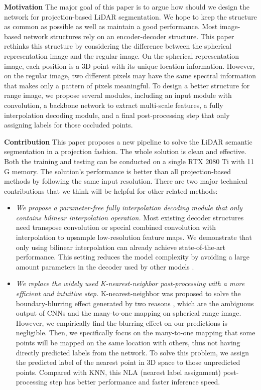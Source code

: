 \documentclass[letterpaper, 10 pt, conference]{ieeeconf}
\begin{document}
\textbf{Motivation} The major goal of this paper is to argue how should we design the network for projection-based LiDAR segmentation. We hope to keep the structure as common as possible as well as maintain a good performance. Most image-based network structures rely on an encoder-decoder structure. This paper rethinks this structure by considering the difference between the spherical representation image and the regular image. On the spherical representation image, each position is a 3D point with its unique location information. However, on the regular image, two different pixels may have the same spectral information that makes only a pattern of pixels meaningful. To design a better structure for range image, we propose several modules, including an input module with  convolution, a backbone network to extract multi-scale features, a fully interpolation decoding module, and a final post-processing step that only assigning labels for those occluded points.   

\textbf{Contribution} This paper proposes a new pipeline to solve the LiDAR semantic segmentation in a projection fashion. The whole solution is clean and effective. Both the training and testing can be conducted on a single RTX 2080 Ti with 11 G memory. The solution's performance is better than all projection-based methods by following the same  input resolution. There are two major technical contributions that we think will be helpful for other related methods:

\begin{itemize}
    \item \emph{We propose a parameter-free fully interpolation decoding module that only contains bilinear interpolation operation.} Most existing decoder structures need transpose convolution or special combined convolution with interpolation to upsample low-resolution feature maps. We demonstrate that only using bilinear interpolation can already achieve state-of-the-art performance. This setting reduces the model complexity by avoiding a large amount parameters in the decoder used by other models \cite{cheng2020panoptic, cortinhal2020salsanext}. 
    
    \item \emph{We replace the widely used K-nearest-neighbor post-processing with a more efficient and intuitive step.} K-nearest-neighbor was proposed to solve the boundary-blurring effect generated by two reasons \cite{milioto2019rangenet++}, which are the ambiguous output of CNNs and the many-to-one mapping on spherical range image. However, we empirically find the blurring effect on our predictions is negligible. Then, we specifically focus on the many-to-one mapping that some points will be mapped on the same location with others, thus not having directly predicted labels from the network. To solve this problem, we assign the predicted label of the nearest point in 3D space to those unpredicted points. Compared with KNN, this NLA (nearest label assignment) post-processing step has better performance and faster inference speed.
\end{itemize}
\end{document}
